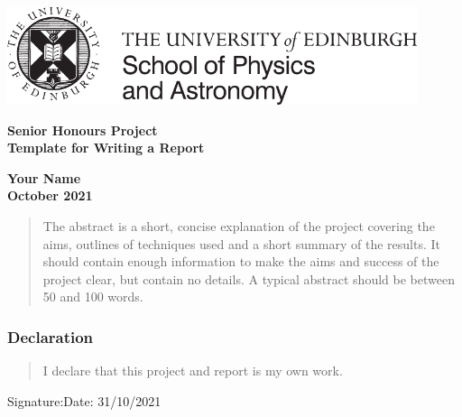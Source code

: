\documentclass[a4paper,12pt]{article}
\begin{document}
\pagestyle{empty}                       %

\par\noindent\includegraphics[width=12cm]{PandA_crest.pdf}

\par\noindent                                           %
\vspace*{2cm}
\begin{center}
        \Large\bf \Large\bf Senior Honours Project\\
        \LARGE\bf Template for Writing a Report         %
\end{center}
\vspace*{0.5cm}
\begin{center}
        \bf Your Name\\                               %
        October 2021                                   %
\end{center}
\vspace*{5mm}
%
\begin{abstract}
        The abstract is a short, concise explanation of the project
        covering the aims, outlines of techniques used and a short
        summary of the results. It should contain enough information to
        make the aims and success of the project clear, but contain no details.
        A typical abstract should be between 50 and 100 words.
\end{abstract}

\vspace*{1cm}

\subsubsection*{Declaration}

\begin{quotation}
  I declare that this project and report is my own work.
\end{quotation}

\vspace*{2cm}
Signature:\hspace*{8cm}Date:  31/10/2021         %
\end{document}
